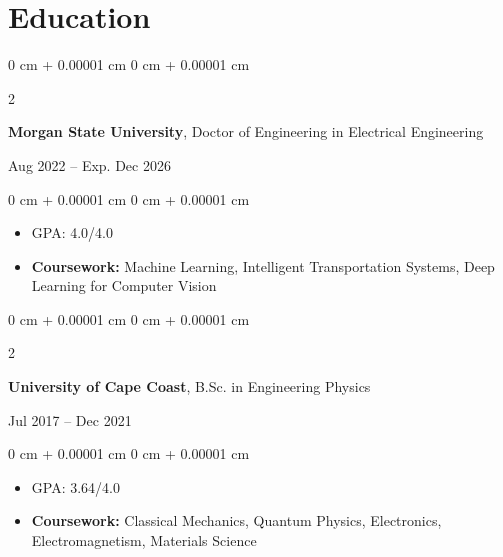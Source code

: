 \documentclass[10pt, letterpaper]{article}
\newenvironment{highlights}{
    \begin{itemize}[
        topsep=0.10 cm,
        parsep=0.10 cm,
        partopsep=0pt,
        itemsep=0pt,
        leftmargin=0 cm + 10pt
    ]
}{
    \end{itemize}
} %
\newenvironment{onecolentry}{
    \begin{adjustwidth}{
        0 cm + 0.00001 cm
    }{
        0 cm + 0.00001 cm
    }
}{
    \end{adjustwidth}
} %
\newenvironment{twocolentry}[2][]{
    \onecolentry
    \def\secondColumn{#2}
    \setcolumnwidth{\fill, 4.5 cm}
    \begin{paracol}{2}
}{
    \switchcolumn \raggedleft \secondColumn
    \end{paracol}
    \endonecolentry
} %
\begin{document}






    \section{Education}
            
    \begin{twocolentry}{
        Aug 2022 – Exp. Dec 2026
    }
        \textbf{Morgan State University}, Doctor of Engineering in Electrical Engineering
    \end{twocolentry}
    
    \vspace{0.10 cm}
    \begin{onecolentry}
        \begin{highlights}
            \item GPA: 4.0/4.0
            \item \textbf{Coursework:} Machine Learning, Intelligent Transportation Systems, Deep Learning for Computer Vision
        \end{highlights}
    \end{onecolentry}
    
    \vspace{0.25 cm}
    
    \begin{twocolentry}{
        Jul 2017 – Dec 2021
    }
        \textbf{University of Cape Coast}, B.Sc. in Engineering Physics
    \end{twocolentry}
    
    \vspace{0.10 cm}
    \begin{onecolentry}
        \begin{highlights}
            \item GPA: 3.64/4.0
            \item \textbf{Coursework:} Classical Mechanics, Quantum Physics, Electronics, Electromagnetism, Materials Science
        \end{highlights}
    \end{onecolentry}
    
\end{document}

